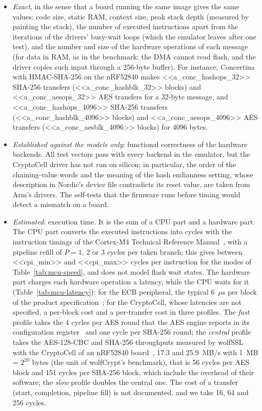 \begin{itemize}
\item \emph{Exact}, in the sense that a board running the same image gives
the same values: code size, static RAM, context size, peak stack depth
(measured by painting the stack), the number of executed instructions apart
from the iterations of the drivers' busy-wait loops (which the emulator
leaves after one test), and the number and size of the hardware operations
of each message (for data in RAM, as in the benchmark; the DMA cannot read
flash, and the driver copies such input through a 256-byte buffer). For
instance, Concertina with HMAC-SHA-256 on the nRF52840 makes <<a_conc_hashops_32>> SHA-256 transfers
(<<a_conc_hashblk_32>> blocks) and <<a_conc_aesops_32>> AES transfers for a
32-byte message, and <<a_conc_hashops_4096>> SHA-256 transfers
(<<a_conc_hashblk_4096>> blocks) and <<a_conc_aesops_4096>> AES transfers
(<<a_conc_aesblk_4096>> blocks) for 4096 bytes.
\item \emph{Established against the models only}: functional
correctness of the hardware backends. All test vectors pass with every
backend in the emulator, but the CryptoCell driver has not run on silicon;
in particular, the order of the chaining-value words and the meaning of the
hash endianness setting, whose description in Nordic's device file
contradicts its reset value, are taken from Arm's drivers. The self-tests
that the firmware runs before timing would detect a mismatch on a board.
\item \emph{Estimated}: execution time. It is the sum of a CPU part and a
hardware part. The CPU part converts the executed instructions into cycles
with the instruction timings of the Cortex-M4 Technical Reference
Manual~\cite{armCortexM4TRM},
with a pipeline refill of $P = 1$, 2 or 3 cycles per taken branch; this
gives between <<cpi_min>> and <<cpi_max>> cycles per instruction for the
modes of Table~\ref{tab:mcu-speed}, and does not model flash wait states. The
hardware part charges each hardware operation a latency, while the CPU waits
for it (Table~\ref{tab:mcu-latency}): for the ECB peripheral, the typical
6~$\mu$s per block of the product specification~\cite{nrf52832ecb}; for the CryptoCell, whose
latencies are not specified, a per-block cost and a per-transfer cost in
three profiles. The \emph{fast} profile takes the 4 cycles per AES round
that the AES engine reports in its configuration
register~\cite{nrf52840cryptocell} and one cycle per SHA-256 round; the
\emph{central} profile takes the AES-128-CBC and SHA-256 throughputs
measured by wolfSSL with the CryptoCell of an nRF52840
board~\cite{wolfSSLCC310}, 17.3 and 25.9~MB/s with 1~MB = $2^{20}$ bytes
(the unit of wolfCrypt's benchmark), that is 56 cycles per AES block and
151 cycles per SHA-256 block, which include the overhead of their
software; the \emph{slow} profile doubles the central one. The cost of a
transfer (start, completion, pipeline fill) is not documented, and we take
16, 64 and 256 cycles.
\end{itemize}

